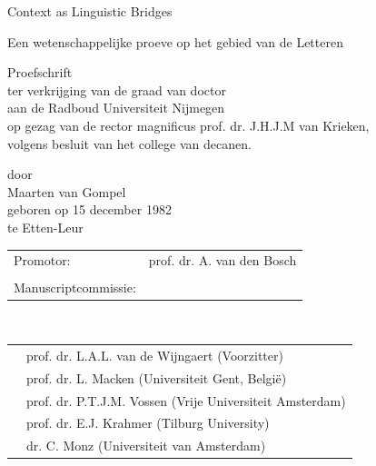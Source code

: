 \documentclass[11pt,makeidx,english]{style/phdthesis}
\author{Maarten van Gompel}
\theoremstyle{break}
\newcommand{\withdate}[1]{%
    \IfSubStringInString{\detokenize{withdate}}{\jobname}{#1}{}%
}
\begin{document}
\frontmatter

\pagestyle{plain}



\begin{titlepage}
\begin{center}
\vspace{8cm}
{\Huge Context as Linguistic Bridges}


\vspace{1cm}
Een wetenschappelijke proeve op het gebied van de Letteren

\vspace{6cm}
{\LARGE Proefschrift }\\
\vspace{1cm}
ter verkrijging van de graad van doctor\\
aan de Radboud Universiteit Nijmegen\\
op gezag van de rector magnificus prof. dr. J.H.J.M van Krieken,\\
volgens besluit van het college van decanen.\\
\withdate{}

\vspace{2cm}

door\\
\vspace{1cm}
{\LARGE Maarten van Gompel}\\
\vspace{0.5cm}
geboren op 15 december 1982\\
te Etten-Leur


\vspace{0.5cm}


\end{center}

\clearpage

\thispagestyle{empty}
\begin{tabular}{ll}
Promotor: & prof. dr. A. van den Bosch \\
 & \\
Manuscriptcommissie: & \\
\end{tabular}
\\
\begin{tabular}{m{1cm}l}
 & prof. dr. L.A.L. van de Wijngaert (Voorzitter)  \\
 & prof. dr. L. Macken (Universiteit Gent, België) \\
 & prof. dr. P.T.J.M. Vossen (Vrije Universiteit Amsterdam) \\
 & prof. dr. E.J. Krahmer  (Tilburg University) \\
 & dr. C. Monz  (Universiteit van Amsterdam) \\
\end{tabular}



\end{titlepage}
\end{document}
